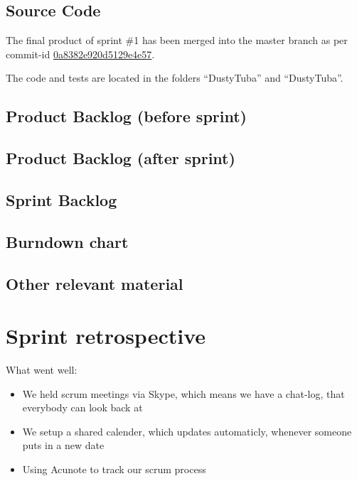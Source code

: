 \documentclass[a4paper,11pt]{article}
\begin{document}

\subsection{Source Code}
The final product of sprint \#1 has been merged into the master branch as per commit-id  \href{https://github.com/omegahm/DBP2P/commit/0a8382e920d5129e4e57a7e54018b8769dcb3273}{0a8382e920d5129e4e57}.

The code and tests are located in the folders ``DustyTuba'' and ``DustyTuba''.

\subsection{Product Backlog (before sprint)}

\subsection{Product Backlog (after sprint)}

\subsection{Sprint Backlog}

\subsection{Burndown chart}

\subsection{Other relevant material}


\section{Sprint retrospective}


What went well:
\begin{itemize}
	\item We held scrum meetings via Skype, which means we have a chat-log, that everybody can look back at
	\item We setup a shared calender, which updates automaticly, whenever someone puts in a new date 
	\item Using Acunote to track our scrum process
\end{itemize}
\end{document}

